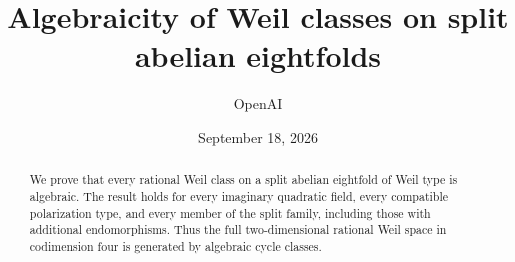\documentclass[11pt]{article}
\title{Algebraicity of Weil classes on split abelian eightfolds}
\author{OpenAI}
\date{September 18, 2026}
\begin{document}
\maketitle
\begin{abstract}
We prove that every rational Weil class on a split abelian eightfold of
Weil type is algebraic. The result holds for every imaginary quadratic
field, every compatible polarization type, and every member of the split
family, including those with additional endomorphisms. Thus the full
two-dimensional rational Weil space in codimension four is generated by
algebraic cycle classes.
\end{abstract}
\tableofcontents













\end{document}
